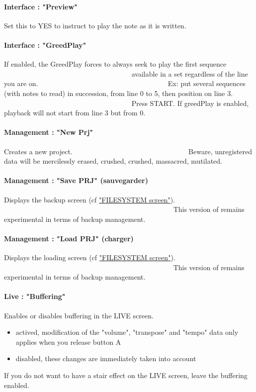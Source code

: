 \paragraph{Interface : "Preview"} Set this to YES to instruct \FAT to play the note as it is written.

\paragraph{Interface : "GreedPlay"} If enabled, the GreedPlay forces \FAT to always seek to play the first sequence
                                     available in a set regardless of the line you are on.
                                     Ex: put several sequences (with notes to read) in succession, from line 0 to 5, then position on line 3.
                                     Press START. If greedPlay is enabled, playback will not start from line 3 but from 0.

\paragraph{Management : "New Prj"} Creates a new project.
                                 Beware, unregistered data will be mercilessly erased, crushed, crushed, massacred, mutilated.

\paragraph{Management : "Save PRJ" (sauvegarder)}  Displays the backup screen (cf \hyperref [sec: filesystem] {"FILESYSTEM screen"}).
                                                 This version of \FAT remains experimental in terms of backup management.

\paragraph{Management : "Load PRJ" (charger)} Displays the loading screen (cf \hyperref [sec: filesystem] {"FILESYSTEM screen"}).
                                                 This version of \FAT remains experimental in terms of backup management.

\paragraph{Live : "Buffering"}
Enables or disables buffering in the LIVE screen.
\medskip

\begin{itemize}
    \item{actived, modification of the "volume", "transpose" and "tempo" data only applies when you release button A}
    \item{disabled, these changes are immediately taken into account}
\end{itemize}
\medskip
If you do not want to have a stair effect on the LIVE screen, leave the buffering enabled.
